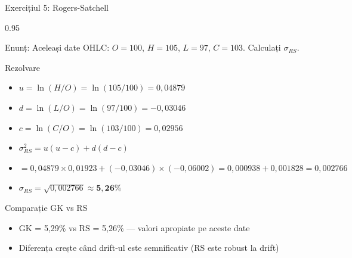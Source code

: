 \documentclass[9pt, aspectratio=169, t]{beamer}
\begin{document}
\begin{frame}[shrink=10]{Exercițiul 5: Rogers-Satchell}
    \begin{cminipage}{0.95\textwidth}
    \begin{block}{Enunț: Aceleași date OHLC: $O = 100$, $H = 105$, $L = 97$, $C = 103$. Calculați $\sigma_{RS}$.}
    \end{block}
    \vspace{0.1cm}
    \begin{exampleblock}{Rezolvare}
    \begin{itemize}\setlength{\itemsep}{0pt}
        \item $u = \ln(H/O) = \ln(105/100) = 0{,}04879$
        \item $d = \ln(L/O) = \ln(97/100) = -0{,}03046$
        \item $c = \ln(C/O) = \ln(103/100) = 0{,}02956$
        \item $\sigma_{RS}^2 = u(u - c) + d(d - c)$
        \item $= 0{,}04879 \times 0{,}01923 + (-0{,}03046) \times (-0{,}06002) = 0{,}000938 + 0{,}001828 = 0{,}002766$
        \item $\sigma_{RS} = \sqrt{0{,}002766} \approx \mathbf{5{,}26\%}$
    \end{itemize}
    \end{exampleblock}
    \begin{alertblock}{Comparație GK vs RS}
    \begin{itemize}\setlength{\itemsep}{0pt}
        \item GK = 5,29\% vs RS = 5,26\% --- valori apropiate pe aceste date
        \item Diferența crește când drift-ul este semnificativ (RS este robust la drift)
    \end{itemize}
    \end{alertblock}
    \end{cminipage}
\end{frame}
\end{document}
